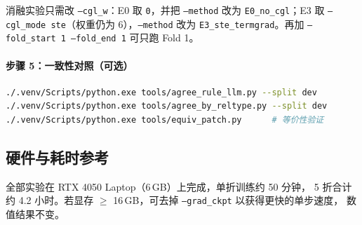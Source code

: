 \noindent 消融实验只需改 \texttt{--cgl\_w}：E0 取 \texttt{0}，并把 \texttt{--method} 改为
\texttt{E0\_no\_cgl}；E3 取 \texttt{--cgl\_mode ste}（权重仍为 6），\texttt{--method} 改为
\texttt{E3\_ste\_termgrad}。再加 \texttt{--fold\_start 1 --fold\_end 1} 可只跑 Fold 1。

\paragraph{步骤 5：一致性对照（可选）}

\begin{lstlisting}[language=bash]
./.venv/Scripts/python.exe tools/agree_rule_llm.py --split dev
./.venv/Scripts/python.exe tools/agree_by_reltype.py --split dev
./.venv/Scripts/python.exe tools/equiv_patch.py      # 等价性验证
\end{lstlisting}

\subsection{硬件与耗时参考}

全部实验在 RTX 4050 Laptop（6\,GB）上完成，单折训练约 50 分钟，
5 折合计约 4.2 小时。若显存 $\ge$ 16\,GB，可去掉 \texttt{--grad\_ckpt} 以获得更快的单步速度，
数值结果不变。
